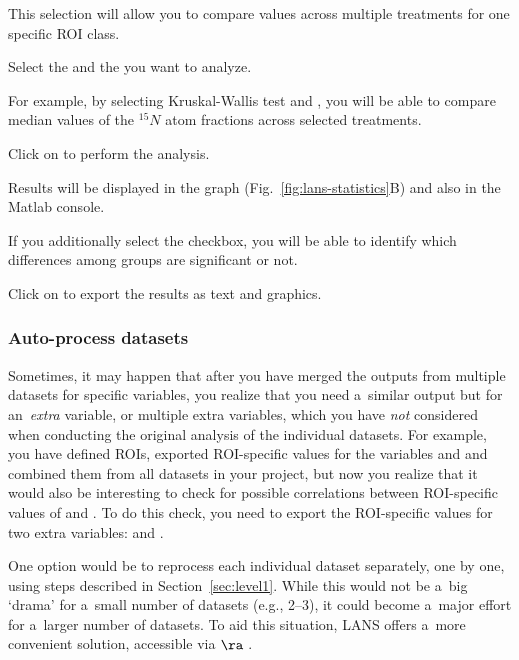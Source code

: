 \nb
\bul This selection will allow you to compare values across multiple treatments for one specific ROI class.

\s Select the  and the  you want to analyze.

\nb
\bul For example, by selecting Kruskal-Wallis test and , you will be able to compare median values of the ${}^{15}N$ atom fractions across selected treatments.

\s Click on  to perform the analysis. 

\nb
\bul Results will be displayed in the graph (Fig.~\ref{fig:lans-statistics}B) and also in the Matlab console.

\bul If you additionally select the  checkbox, you will be able to identify which differences among groups are significant or not.

\s Click on  to export the results as text and graphics.


\subsubsection{Auto-process datasets}
\setcounter{step}{0}

\goldbox{}
Sometimes, it may happen that after you have merged the outputs from multiple datasets for specific variables, you realize that you need a~similar output but for an~\emph{extra} variable, or multiple extra variables, which you have \emph{not} considered when conducting the original analysis of the individual datasets. For example, you have defined ROIs, exported ROI-specific values for the variables  and  and combined them from all datasets in your project, but now you realize that it would also be interesting to check for possible correlations between ROI-specific values of  and . To do this check, you need to export the ROI-specific values for two extra variables:  and . 
\tcbe

One option would be to reprocess each individual dataset separately, one by one, using steps described in Section~\ref{sec:level1}. While this would not be a~big `drama' for a~small number of datasets (e.g., 2--3), it could become a~major effort for a~larger number of datasets. To aid this situation, LANS offers a~more convenient solution, accessible via  $\ra$ .

